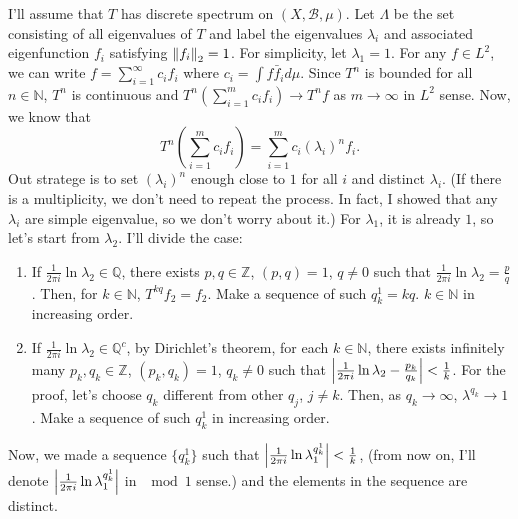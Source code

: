 \documentclass[12pt]{article}
\newenvironment{problem}[2][Problem]{\begin{trivlist}
\item[\hskip \labelsep {\bfseries #1}\hskip \labelsep {\bfseries #2.}]}{\end{trivlist}}
\begin{document}
\begin{problem}{8}
\end{problem}
I'll assume that $T$ has discrete spectrum on $(X, \mathcal{B}, \mu)$. Let $\Lambda$ be the set consisting of all eigenvalues of $T$ and label the eigenvalues $\lambda_i$ and associated eigenfunction $f_i$ satisfying $\norm{f_i}_2=1$. For simplicity, let $\lambda_1=1$. For any $f\in L^2$, we can write $f=\sum\limits_{i=1}^\infty c_i f_i$ where $c_i=\int f \bar{f}_i d\mu$. Since $T^n$ is bounded for all $n\in \mathbb{N}$, $T^n$ is continuous and $T^n(\sum_{i=1}^m c_i f_i)\rightarrow T^nf$ as $m\rightarrow \infty$ in $L^2$ sense. Now, we know that
\begin{equation*}
    T^n(\sum_{i=1}^m c_i f_i)=\sum_{i=1}^m c_i(\lambda_i)^n f_i.
\end{equation*}
Out stratege is to set $(\lambda_i)^n$ enough close to $1$ for all $i$ and distinct $\lambda_i$. (If there is a multiplicity, we don't need to repeat the process. In fact, I showed that any $\lambda_i$ are simple eigenvalue, so we don't worry about it.) For $\lambda_1$, it is already $1$, so let's start from $\lambda_2$. I'll divide the case:
\begin{enumerate}
    \item[-]If $\frac{1}{2\pi i}\ln\lambda_2\in\mathbb{Q}$, there exists $p,q\in \mathbb{Z}$, $(p,q)=1$, $q\neq 0$ such that $\frac{1}{2\pi i}\ln\lambda_2=\frac{p}{q}$. Then, for $k\in \mathbb{N}$, $T^{kq}f_2=f_2$. Make a sequence of such $q^1_k=kq$. $k\in \mathbb{N}$ in increasing order.
    \item[-]If $\frac{1}{2\pi i}\ln\lambda_2\in\mathbb{Q}^c$, by Dirichlet's theorem, for each $k\in \mathbb{N}$, there exists infinitely many $p_k,q_k\in \mathbb{Z}$, $(p_k,q_k)=1$, $q_k\neq 0$ such that $\abs{\frac{1}{2\pi i}\ln\lambda_2-\frac{p_k}{q_k}}<\frac{1}{k}$. For the proof, let's choose $q_k$ different from other $q_j$, $j\neq k$. Then, as $q_k\rightarrow \infty$, $\lambda^{q_k}\rightarrow 1$. Make a sequence of such $q^1_k$ in increasing order.
\end{enumerate}
Now, we made a sequence $\{q^1_k\}$ such that $\abs{\frac{1}{2\pi i}\ln\lambda_1^{q^1_k}}<\frac{1}{k}$, (from now on, I'll denote $\abs{\frac{1}{2\pi i}\ln\lambda_1^{q^1_k}}$ in $\mod 1$ sense.) and the elements in the sequence are distinct.
\end{document}

